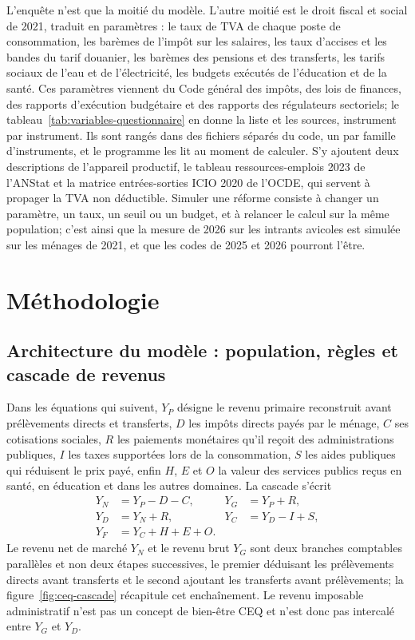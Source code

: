 \documentclass[11pt,a4paper]{article}
\begin{document}
L'enquête n'est que la moitié du modèle. L'autre moitié est le droit fiscal et
social de 2021, traduit en paramètres : le taux de TVA de chaque poste de
consommation, les barèmes de l'impôt sur les salaires, les taux d'accises et les
bandes du tarif douanier, les barèmes des pensions et des transferts, les tarifs
sociaux de l'eau et de l'électricité, les budgets exécutés de l'éducation et de
la santé. Ces paramètres viennent du Code général des impôts, des lois de
finances, des rapports d'exécution budgétaire et des rapports des régulateurs
sectoriels; le tableau~\ref{tab:variables-questionnaire} en donne la liste et
les sources, instrument par instrument. Ils sont rangés dans des fichiers
séparés du code, un par famille d'instruments, et le programme les lit au
moment de calculer. S'y ajoutent deux
descriptions de l'appareil productif, le tableau ressources-emplois 2023 de
l'ANStat et la matrice entrées-sorties ICIO 2020 de l'OCDE, qui servent à
propager la TVA non déductible. Simuler une réforme consiste à changer un
paramètre, un taux, un seuil ou un budget, et à relancer le calcul sur la même
population; c'est ainsi que la mesure de 2026 sur les intrants avicoles est
simulée sur les ménages de 2021, et que les codes de 2025 et 2026 pourront
l'être.

\section{Méthodologie}
\label{sec:methode}

\subsection{Architecture du modèle : population, règles et cascade de revenus}
\label{sec:architecture}

Dans les équations qui suivent, $Y_P$ désigne le revenu primaire reconstruit
avant prélèvements directs et transferts, $D$ les impôts directs payés par le
ménage, $C$ ses cotisations sociales, $R$ les paiements monétaires qu'il reçoit
des administrations publiques, $I$ les taxes supportées lors de la consommation,
$S$ les aides publiques qui réduisent le prix payé, enfin $H$, $E$ et $O$ la
valeur des services publics reçus en santé, en éducation et dans les autres
domaines. La cascade s'écrit
\begin{align}
Y_N &= Y_P-D-C, &
Y_G &= Y_P+R, \label{eq:ceq-branches}\\
Y_D &= Y_N+R, &
Y_C &= Y_D-I+S, \label{eq:ceq-cash}\\
Y_F &= Y_C+H+E+O. \label{eq:ceq-final}
\end{align}
Le revenu net de marché $Y_N$ et le revenu brut $Y_G$ sont deux branches
comptables parallèles et non deux étapes successives, le premier déduisant les
prélèvements directs avant transferts et le second ajoutant les transferts avant
prélèvements; la figure~\ref{fig:ceq-cascade} récapitule cet enchaînement. Le
revenu imposable administratif n'est pas un concept de bien-être CEQ et n'est
donc pas intercalé entre $Y_G$ et $Y_D$.
\end{document}
